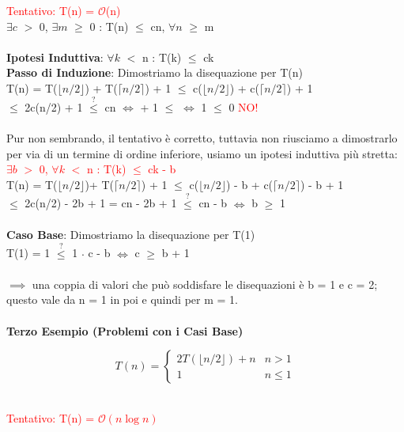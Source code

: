 \documentclass[../cheatSheetAlgoritmi.tex]{subfiles}
\begin{document}
\textcolor{red}{Tentativo: T(n) = $\mathcal{O}$(n)}\\
$\exists c$ $>$ 0, $\exists m$ $\geq$ 0 : T(n) $\leq$ cn, $\forall n$ $\geq$ m\\\\
\textbf{Ipotesi Induttiva}: $\forall k$ $<$ n : T(k) $\leq$ ck\\
\textbf{Passo di Induzione}: Dimostriamo la disequazione per T(n)\\
T(n) =  T($\lfloor n/2 \rfloor$) + T($\lceil n/2 \rceil$) + 1 $\leq$ c($\lfloor n/2 \rfloor$) + c($\lceil n/2 \rceil$) + 1\\
$\leq$ 2c(n/2) + 1 $\stackrel{?}{\leq}$ cn $\iff$  + 1 $\leq$  $\iff$ 1 $\leq$ 0 \textcolor{red}{NO!}\\\\
Pur non sembrando, il tentativo è corretto, tuttavia non riusciamo a dimostrarlo per via di un termine di ordine inferiore, usiamo un ipotesi induttiva più stretta:\\
\textcolor{red}{$\exists b$ $>$ 0, $\forall k$ $<$ n : T(k) $\leq$ ck - b}\\
T(n) =  T($\lfloor n/2 \rfloor$)+ T($\lceil n/2 \rceil$) + 1 $\leq$ c($\lfloor n/2 \rfloor$) - b + c($\lceil n/2 \rceil$) - b + 1\\
$\leq$ 2c(n/2) - 2b + 1 = cn - 2b + 1 $\stackrel{?}{\leq}$ cn - b $\iff$ b $\geq$ 1\\\\
\textbf{Caso Base}: Dimostriamo la disequazione per T(1)\\
T(1) = 1 $\stackrel{?}{\leq}$ 1 $\cdot$ c - b $\iff$ c $\geq$ b + 1\\\\
$\implies$ una coppia di valori che può soddisfare le disequazioni è b = 1 e c = 2; questo vale da n = 1 in poi e quindi per m = 1.\\\\
\textbf{Terzo Esempio (Problemi con i Casi Base)}
\begin{center}
	\begin{equation*}
  		T(n)=\begin{cases}
    		2T(\lfloor n/2 \rfloor) + n & \text{$n > 1$}\\
    		1 & \text{$n \leq 1$}
  		\end{cases}
	\end{equation*}
\end{center}
\hfill\\
\textcolor{red}{Tentativo: T(n) = $\mathcal{O}(n\log{n})$}\\
\end{document}
